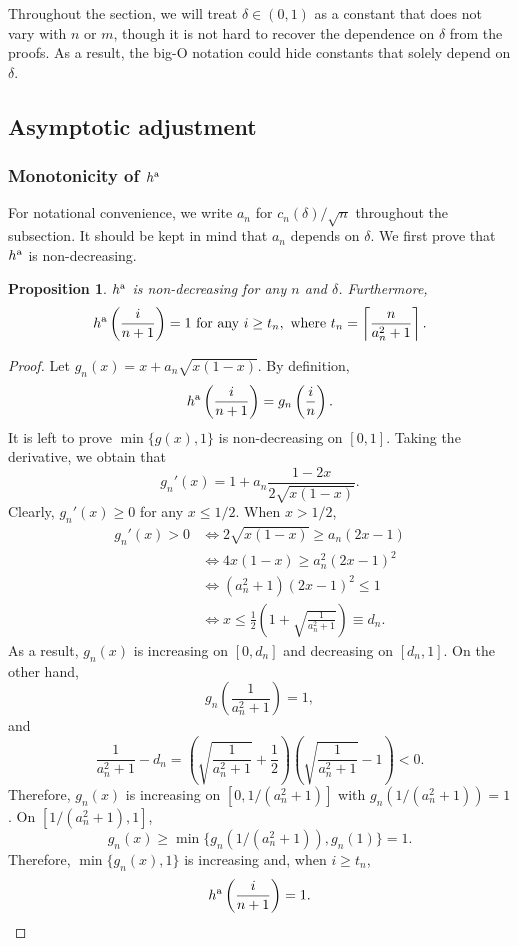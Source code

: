 \documentclass[11pt]{article}
\newtheorem{prop}{Proposition}
\def\asym{\textnormal{a}}
\newcommand{\lb}{\left(}
\newcommand{\rb}{\right)}
\begin{document}
Throughout the section, we will treat $\delta\in (0, 1)$ as a constant that does not vary with $n$ or $m$, though it is not hard to recover the dependence on $\delta$ from the proofs. As a result, the big-O notation could hide constants that solely depend on $\delta$. 

\subsection{Asymptotic adjustment}\label{subsec:fisher_asym}
\subsubsection{Monotonicity of $h^\asym$}\label{subsubsec:fisher_asym_monotonicity}
  For notational convenience, we write $a_n$ for $c_n(\delta) / \sqrt{n}$ throughout the subsection. It should be kept in mind that $a_{n}$ depends on $\delta$. We first prove that $h^\asym$ is non-decreasing.
  \begin{prop}\label{prop:hasym_increasing}
  $h^\asym$ is non-decreasing for any $n$ and $\delta$. Furthermore,
  \[h^\asym\lb \frac{i}{n+1}\rb = 1\text{ for any }i\ge t_n, \text{ where }t_n = \left\lceil \frac{n}{a_n^2 + 1}\right\rceil.\]
\end{prop}
\begin{proof}
  Let $g_n(x) = x + a_n\sqrt{x(1 - x)}$. By definition,
  \[h^\asym\lb \frac{i}{n+1}\rb = g_n\lb\frac{i}{n}\rb.\]
  It is left to prove $\min\{g(x), 1\}$ is non-decreasing on $[0, 1]$. Taking the derivative, we obtain that
  \[g_n'(x) = 1 + a_n \frac{1 - 2x}{2\sqrt{x(1 - x)}}.\]
  Clearly, $g_n'(x)\ge 0$ for any $x \le 1/2$. When $x > 1/2$,
  \begin{align*}
    g_n'(x) > 0 & \Longleftrightarrow 2\sqrt{x(1 - x)} \ge a_n(2x - 1)\\
              & \Longleftrightarrow 4x(1 - x) \ge a_n^2(2x - 1)^2\\
              & \Longleftrightarrow (a_n^2 + 1)(2x - 1)^2 \le 1\\
              & \Longleftrightarrow x \le \frac{1}{2}\lb 1 + \sqrt{\frac{1}{a_n^2 + 1}}\rb\equiv d_n.
  \end{align*}
  As a result, $g_n(x)$ is increasing on $[0, d_n]$ and decreasing on $[d_n, 1]$. On the other hand,
  \[g_n\lb\frac{1}{a_n^2 + 1}\rb = 1,\]
  and
  \[\frac{1}{a_n^2 + 1} - d_n = \lb \sqrt{\frac{1}{a_n^2 + 1}} + \frac{1}{2}\rb\lb \sqrt{\frac{1}{a_n^2 + 1}}- 1\rb < 0.\]
  Therefore, $g_n(x)$ is increasing on $[0, 1/(a_n^2 + 1)]$ with $g_n(1/(a_n^2 + 1)) = 1$. On $[1/(a_n^2 + 1), 1]$,
  \[g_n(x)\ge \min\{g_n(1/(a_n^2 + 1)), g_n(1)\} = 1.\]
  Therefore, $\min\{g_n(x), 1\}$ is increasing and, when $i\ge t_n$,
  \[h^\asym\lb\frac{i}{n+1}\rb = 1.\]
\end{proof}
\end{document}
